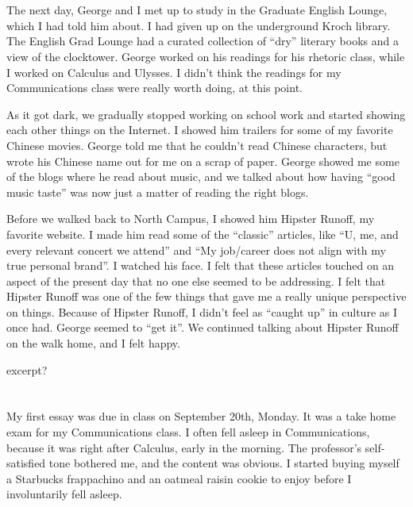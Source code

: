 \section{}

The next day, George and I met up to study in the Graduate English Lounge, which
I had told him about.  I had given up on the underground Kroch library.  The
English Grad Lounge  had a curated collection of ``dry'' literary books and a
view of the clocktower.  George worked on his readings for his rhetoric class,
while I worked on Calculus and Ulysses.  I didn't think the readings for my
Communications class were really worth doing, at this point.

As it got dark, we gradually stopped working on school work and started showing
each other things on the Internet.  I showed him trailers for some of my
favorite Chinese movies.  George told me that he couldn't read Chinese
characters, but wrote his Chinese name out for me on a scrap of paper.  George
showed me some of the blogs where he read about music, and we talked about how
having ``good music taste'' was now just a matter of reading the right blogs.  

Before we walked back to North Campus, I showed him Hipster Runoff, my favorite
website.  I made him read some of the ``classic'' articles, like ``U, me, and
every relevant concert we attend'' and ``My job/career does not align with my
true personal brand''.  I watched his face.  I felt that these articles touched
on an aspect of the present day that no one else seemed to be addressing.  I
felt that Hipster Runoff was one of the few things that gave me a really unique
perspective on things.  Because of Hipster Runoff, I didn't feel as ``caught
up'' in culture as I once had.   George seemed to ``get it''.   We continued
talking about Hipster Runoff on the walk home, and I felt happy.

excerpt?
\section{}

My first essay was due in class on September 20th, Monday.  It was a take home
exam for my Communications class.  I often fell asleep in Communications,
because it was right after Calculus, early in the morning.  The professor's
self-satisfied tone bothered me, and the content was obvious.  I started buying
myself a Starbucks frappachino and an oatmeal raisin cookie to enjoy before I
involuntarily fell asleep.

